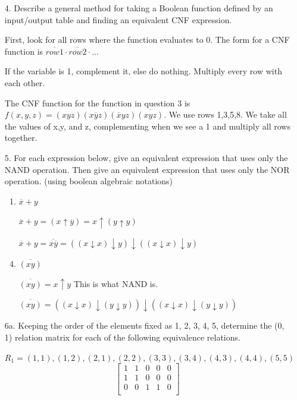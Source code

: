 \documentclass[letterpaper,11pt]{article}
\begin{document}
\begin{enumerate}
    \item[4.] Describe a general method for taking a Boolean function defined by an input/output table and finding an
    equivalent CNF expression.
    \item[] First, look for all rows where the function evaluates to 0. The form for a CNF function is $\overline{row1}\cdot \overline{row2}\cdot ...$
    \item[] If the variable is 1, complement it, else do nothing. Multiply every row with each other. 
    \item[] The CNF function for the function in question 3 is $f(x,y,z) = (xyz)(x\overline{y}z)(\overline{x}yz)\overline{(xyz)}$. We use rows 1,3,5,8. We take all the values of x,y, and z, complementing when we see a 1 and multiply all rows together.
    \newpage
    \item[5.] For each expression below, give an equivalent expression that uses only the NAND operation. Then give an
    equivalent expression that uses only the NOR operation. (using boolean algebraic notations)
    \begin{enumerate}
        \item $\overline{x} + y$
        \item[] $\overline{x} + y = (x \uparrow \overline{y}) = x \uparrow (y \uparrow y)$
        \item[] $\overline{x} + y = \overline{x\overline{y}} = ((x \downarrow x) \downarrow y)\downarrow ((x \downarrow x)\downarrow y)$
        \item $\overline{(xy)}$
        \item[] $\overline{(xy)} = x \uparrow y$ This is what NAND is. 
        \item[] $\overline{(xy)} = ((x \downarrow x) \downarrow (y \downarrow y)) \downarrow ((x \downarrow x) \downarrow (y \downarrow y))$
    \end{enumerate}
    \item[6a.] Keeping the order of the elements fixed as 1, 2, 3, 4, 5, determine the (0, 1) relation matrix for each of
    the following equivalence relations.
    \item[] $R_1 = {(1, 1),(1, 2),(2, 1),(2, 2),(3, 3),(3, 4),(4, 3),(4, 4),(5, 5)}$
    \begin{equation}
        \begin{bmatrix}
            1 & 1 & 0 & 0 & 0\\
            1 & 1 & 0 & 0 & 0\\
            0 & 0 & 1 & 1 & 0\\

\end{bmatrix}
\end{equation}
\end{enumerate}
\end{document}
